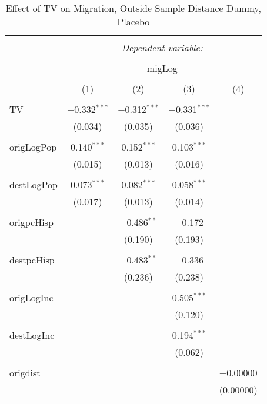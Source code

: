 
\begin{table}[!htbp] \centering 
  \caption{Effect of TV on Migration, Outside Sample Distance Dummy, Placebo} 
  \label{} 
\begin{tabular}{@{\extracolsep{5pt}}lcccc} 
\\[-1.8ex]\hline 
\hline \\[-1.8ex] 
 & \multicolumn{4}{c}{\textit{Dependent variable:}} \\ 
\cline{2-5} 
\\[-1.8ex] & \multicolumn{4}{c}{migLog} \\ 
\\[-1.8ex] & (1) & (2) & (3) & (4)\\ 
\hline \\[-1.8ex] 
 TV & $-$0.332$^{***}$ & $-$0.312$^{***}$ & $-$0.331$^{***}$ &  \\ 
  & (0.034) & (0.035) & (0.036) &  \\ 
  & & & & \\ 
 origLogPop & 0.140$^{***}$ & 0.152$^{***}$ & 0.103$^{***}$ &  \\ 
  & (0.015) & (0.013) & (0.016) &  \\ 
  & & & & \\ 
 destLogPop & 0.073$^{***}$ & 0.082$^{***}$ & 0.058$^{***}$ &  \\ 
  & (0.017) & (0.013) & (0.014) &  \\ 
  & & & & \\ 
 origpcHisp &  & $-$0.486$^{**}$ & $-$0.172 &  \\ 
  &  & (0.190) & (0.193) &  \\ 
  & & & & \\ 
 destpcHisp &  & $-$0.483$^{**}$ & $-$0.336 &  \\ 
  &  & (0.236) & (0.238) &  \\ 
  & & & & \\ 
 origLogInc &  &  & 0.505$^{***}$ &  \\ 
  &  &  & (0.120) &  \\ 
  & & & & \\ 
 destLogInc &  &  & 0.194$^{***}$ &  \\ 
  &  &  & (0.062) &  \\ 
  & & & & \\ 
 origdist &  &  &  & $-$0.00000 \\ 
  &  &  &  & (0.00000) \\ 

\end{tabular}
\end{table}
